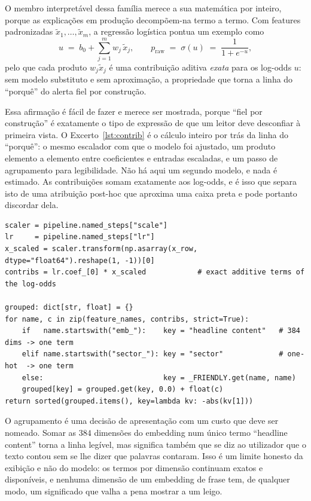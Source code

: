 O membro interpretável dessa família merece a sua matemática por inteiro, porque as explicações em produção
decompõem-na termo a termo. Com features padronizadas $\tilde{x}_1,\dots,\tilde{x}_m$, a regressão logística
pontua um exemplo como
\begin{equation}
u \;=\; b_0 + \sum_{j=1}^{m} w_j\,\tilde{x}_j,
\qquad
p_{\text{raw}} \;=\; \sigma(u) \;=\; \frac{1}{1+e^{-u}},
\label{eq:logistic}
\end{equation}
pelo que cada produto $w_j\tilde{x}_j$ é uma contribuição aditiva \emph{exata} para os log-odds $u$: sem
modelo substituto e sem aproximação, a propriedade que torna a linha do ``porquê'' do alerta fiel por
construção.

Essa afirmação é fácil de fazer e merece ser mostrada, porque ``fiel por construção'' é exatamente o
tipo de expressão de que um leitor deve desconfiar à primeira vista. O Excerto~\ref{lst:contrib} é o
cálculo inteiro por trás da linha do ``porquê'': o mesmo escalador com que o modelo foi ajustado, um
produto elemento a elemento entre coeficientes e entradas escaladas, e um passo de agrupamento para
legibilidade. Não há aqui um segundo modelo, e nada é estimado. As contribuições somam exatamente aos
log-odds, e é isso que separa isto de uma atribuição post-hoc que aproxima uma caixa preta e pode
portanto discordar dela.

\begin{lstlisting}[caption={A linha do ``porquê''. As contribuições são os próprios termos do modelo,
e não uma aproximação deles.}, label={lst:contrib}]
scaler = pipeline.named_steps["scale"]
lr     = pipeline.named_steps["lr"]
x_scaled = scaler.transform(np.asarray(x_row, dtype="float64").reshape(1, -1))[0]
contribs = lr.coef_[0] * x_scaled            # exact additive terms of the log-odds

grouped: dict[str, float] = {}
for name, c in zip(feature_names, contribs, strict=True):
    if   name.startswith("emb_"):    key = "headline content"   # 384 dims -> one term
    elif name.startswith("sector_"): key = "sector"             # one-hot  -> one term
    else:                            key = _FRIENDLY.get(name, name)
    grouped[key] = grouped.get(key, 0.0) + float(c)
return sorted(grouped.items(), key=lambda kv: -abs(kv[1]))
\end{lstlisting}

O agrupamento é uma decisão de apresentação com um custo que deve ser nomeado. Somar as $384$ dimensões
do embedding num único termo ``headline content'' torna a linha legível, mas significa também que se
diz ao utilizador que o texto contou sem se lhe dizer que palavras contaram. Isso é um limite honesto
da exibição e não do modelo: os termos por dimensão continuam exatos e disponíveis, e nenhuma dimensão
de um embedding de frase tem, de qualquer modo, um significado que valha a pena mostrar a um leigo.

